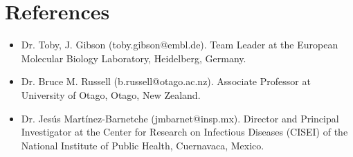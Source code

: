 \documentclass[11pt,a4paper,sans]{moderncv} %
\begin{document}
\pagebreak

\section{References}
\begin{itemize}
  \item Dr. Toby, J. Gibson (toby.gibson@embl.de).
  Team Leader at the European Molecular Biology Laboratory, Heidelberg, Germany.
  \item Dr. Bruce M. Russell (b.russell@otago.ac.nz).
  Associate Professor at University of Otago, Otago, New Zealand.
  \item Dr. Jes\'us Mart\'inez-Barnetche (jmbarnet@insp.mx).
  Director and Principal Investigator at the Center for Research on Infectious Diseases (CISEI) of the National Institute of Public Health, Cuernavaca, Mexico.
\end{itemize}
\end{document}
